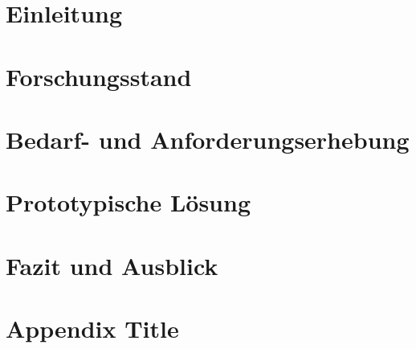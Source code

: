 \documentclass[headings=small,a4paper,12pt,oneside]{scrreprt}
\begin{document}
\singlespacing

\maketitle

\singlespacing
\tableofcontents
\restoregeometry

\singlespacing
\chapter{Einleitung}


\singlespacing 
\chapter{Forschungsstand}


\singlespacing
\chapter{Bedarf- und Anforderungserhebung}


\singlespacing 
\chapter{Prototypische Lösung}


\singlespacing 
\chapter{Fazit und Ausblick}


\singlespacing 
\appendix
\chapter{Appendix Title}

\end{document}
